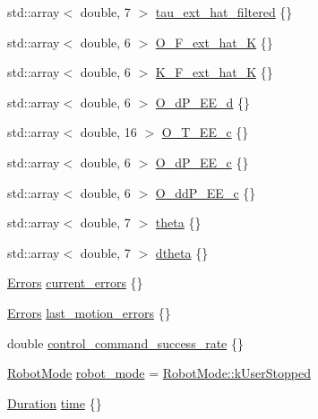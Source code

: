 \begin{DoxyCompactItemize}
\item 
std\+::array$<$ double, 7 $>$ \hyperlink{structfranka_1_1RobotState_acdef8005828d193e45b128085a9e363b}{tau\+\_\+ext\+\_\+hat\+\_\+filtered} \{\}
\item 
std\+::array$<$ double, 6 $>$ \hyperlink{structfranka_1_1RobotState_a5a830b4f9d6a3c2dc92e4a9cc6050493}{O\+\_\+\+F\+\_\+ext\+\_\+hat\+\_\+K} \{\}
\item 
std\+::array$<$ double, 6 $>$ \hyperlink{structfranka_1_1RobotState_a96267d443c05fcc58d7ac32f63912649}{K\+\_\+\+F\+\_\+ext\+\_\+hat\+\_\+K} \{\}
\item 
std\+::array$<$ double, 6 $>$ \hyperlink{structfranka_1_1RobotState_a1e0a82b98534929c3061295d5761d607}{O\+\_\+d\+P\+\_\+\+E\+E\+\_\+d} \{\}
\item 
std\+::array$<$ double, 16 $>$ \hyperlink{structfranka_1_1RobotState_a395c48eff099419ea5d42eaf0870fc18}{O\+\_\+\+T\+\_\+\+E\+E\+\_\+c} \{\}
\item 
std\+::array$<$ double, 6 $>$ \hyperlink{structfranka_1_1RobotState_a4be112bd1a9a7d777a67aea4a18a8dcc}{O\+\_\+d\+P\+\_\+\+E\+E\+\_\+c} \{\}
\item 
std\+::array$<$ double, 6 $>$ \hyperlink{structfranka_1_1RobotState_ac8dfcf78ddbb27852484e921d6d66ca1}{O\+\_\+dd\+P\+\_\+\+E\+E\+\_\+c} \{\}
\item 
std\+::array$<$ double, 7 $>$ \hyperlink{structfranka_1_1RobotState_aa34145d77dd411d7ca578c355f0ba2b4}{theta} \{\}
\item 
std\+::array$<$ double, 7 $>$ \hyperlink{structfranka_1_1RobotState_a271db0a55dd346715ed8a0daf3f8887c}{dtheta} \{\}
\item 
\hyperlink{structfranka_1_1Errors}{Errors} \hyperlink{structfranka_1_1RobotState_abc5515f7a27f5de82396ea792a5ecb48}{current\+\_\+errors} \{\}
\item 
\hyperlink{structfranka_1_1Errors}{Errors} \hyperlink{structfranka_1_1RobotState_a06d7019f85339409e932dc086b7a260b}{last\+\_\+motion\+\_\+errors} \{\}
\item 
double \hyperlink{structfranka_1_1RobotState_af208572613a6afcdc61a24970c71fa28}{control\+\_\+command\+\_\+success\+\_\+rate} \{\}
\item 
\hyperlink{namespacefranka_adfe059ae23ebbad59e421edaa879651a}{Robot\+Mode} \hyperlink{structfranka_1_1RobotState_a4943ae75e0e2ec534e0afac31cbcc987}{robot\+\_\+mode} = \hyperlink{namespacefranka_adfe059ae23ebbad59e421edaa879651aaaef321f1c9c879b98c2bcd307ad2305f}{Robot\+Mode\+::k\+User\+Stopped}
\item 
\hyperlink{classfranka_1_1Duration}{Duration} \hyperlink{structfranka_1_1RobotState_aabfdabeaef8c1858c52dd32344bdd039}{time} \{\}
\end{DoxyCompactItemize}


